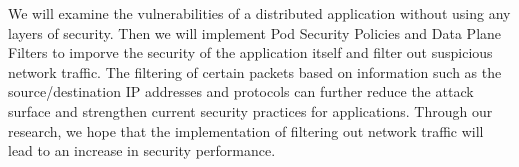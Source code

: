 We will examine the vulnerabilities of a distributed application without using
any layers of security. Then we will implement Pod Security Policies and Data Plane Filters
to imporve the security of the application itself and filter out suspicious network traffic.
The filtering of certain packets based on information such as the source/destination
IP addresses and protocols can further reduce the attack surface and strengthen current security practices
for applications. Through our research, we hope that the implementation of filtering
out network traffic will lead to an increase in security performance.